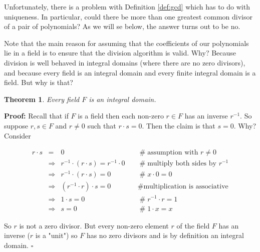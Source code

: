 \documentclass[11pt, oneside]{article}   	%
\newtheorem{thm}{Theorem}[section]
\theoremstyle{definition}
\begin{document}
\noindent
Unfortunately, there is a problem with Definition \ref{def:gcd} which has to do with uniqueness. In particular, could there be more than one greatest common 
divisor of a pair of polynomials?  As we will se below, the answer turns out to be no.

\bigskip
\noindent
Note that the main reason for assuming that the coefficients of our polynomials lie in a field is to ensure that the division algorithm is valid. Why?
Because division is well behaved in integral domains (where there are no zero divisors), and because every field is an integral domain and every finite 
integral domain is a field. But why is that?


\begin{thm}
Every field $F$ is an integral domain.
\label{thm:integral_domain}
\end{thm}

\noindent
\textbf{Proof:} Recall that if $F$ is a field then each non-zero $r \in F$ has an inverse $r^{-1}$. 
So suppose $r,s \in F$ and $r \neq 0$ such that $r \cdot s = 0$. Then the claim is that $s = 0$.
Why? Consider


\begin{equation}
\begin{array}{rcll} 
r \cdot s 
&=& 0                                                                                &\quad  \mathrel{\#} \text{assumption with $r \neq 0$}         \\
&\Rightarrow& r^{-1} \cdot (r \cdot s) = r^{-1} \cdot 0        &\quad  \mathrel{\#} \text{multiply both sides by $r^{-1}$}    \\
&\Rightarrow&  r^{-1} \cdot (r \cdot s) =  0                        &\quad  \mathrel{\#} x \cdot 0 = 0                                          \\
&\Rightarrow&  (r^{-1} \cdot r) \cdot s =  0                        &\quad  \mathrel{\#} \text{multiplication is associative}         \\
&\Rightarrow&  1 \cdot s = 0                                             &\quad  \mathrel{\#} r^{-1} \cdot r = 1                                   \\
&\Rightarrow&  s = 0                                                         &\quad  \mathrel{\#} 1 \cdot x = x
\end{array}
\end{equation}

\bigskip
\noindent
So $r$ is not a zero divisor. But every non-zero element $r$ of the field $F$ has an inverse ($r$ is a "unit")
so $F$ has no zero divisors and is by definition an integral 
domain. $\square$
\end{document}

